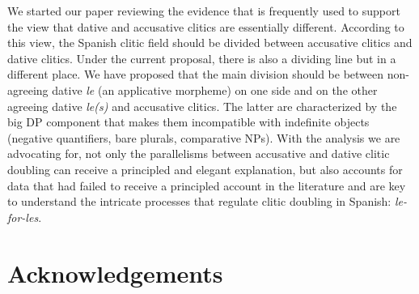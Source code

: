 \documentclass[output=paper,colorlinks,citecolor=brown,
]{langscibook}
\begin{document}
We started our paper reviewing the evidence that is frequently used to support the view that dative and accusative clitics are essentially different. According to this view, the Spanish clitic field should be divided between accusative clitics and dative clitics. Under the current proposal, there is also a dividing line but in a different place. We have proposed that the main division should be between non-agreeing dative \textit{le} (an applicative morpheme) on one side and on the other agreeing dative \textit{le(s)} and accusative clitics. The latter are characterized by the big DP component that makes them incompatible with indefinite objects (negative quantifiers, bare plurals, comparative NPs). With the analysis we are advocating for, not only the parallelisms between accusative and dative clitic doubling can receive a principled and elegant explanation, but also accounts for data that had failed to receive a principled account in the literature and are key to understand the intricate processes that regulate clitic doubling in Spanish: \textit{le-for-les}.

\section*{Acknowledgements}

\printbibliography[heading=subbibliography,notkeyword=this]
\end{document}
